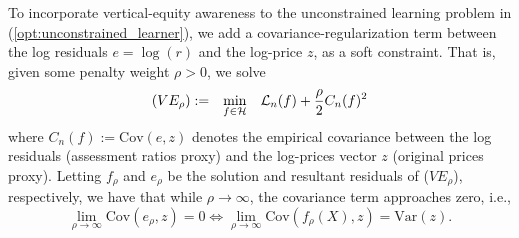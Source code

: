 \documentclass[11pt]{article}
\theoremstyle{plain}
\theoremstyle{definition}
\newcommand{\1}{\mathbf{1}}
\newcommand{\Cov}{\text{Cov}}
\newcommand{\Var}{\text{Var}}
\renewcommand{\L}{\mathcal{L}}
\renewcommand{\H}{\mathcal{H}}
\begin{document}
To incorporate vertical-equity awareness to the unconstrained learning problem in (\ref{opt:unconstrained_learner}), we add a covariance-regularization term between the log residuals $e = \log(r)$ and the log-price $z$, as a soft constraint. That is, given some penalty weight $\rho>0$,  we solve 
\begin{align}
    {\everymath{\displaystyle}
    \begin{array}{ccccccc}
    (VE_{\rho}):= &  \min_{f\in \H}  &  \L_n(f) + \frac{\rho}{2} C_n(f)^2 
    \end{array}
    }
    \label{opt:general_learner_penalized}
\end{align}
where $C_{n}(f):={\text{Cov}}(e ,z)$ denotes the empirical covariance between the log residuals (assessment ratios proxy) and the log-prices vector $z$ (original prices proxy). Letting $f_{\rho}$ and $e_{\rho}$ be the solution and resultant residuals of ($VE_{\rho}$), respectively, we have that while $\rho \rightarrow \infty$, the covariance term approaches zero, i.e., $$\lim_{\rho \rightarrow \infty} {\Cov}(e_{\rho},z) = 0 \iff  \lim_{\rho \rightarrow \infty} {\Cov}(f_{\rho}(X),z) = {\Var}(z).
$$ 
\end{document}
